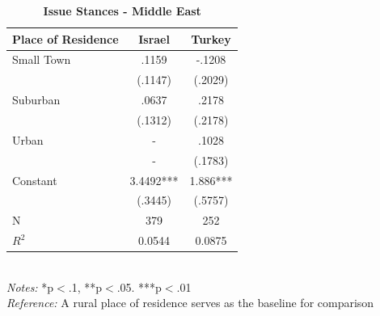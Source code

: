 \documentclass[12pt, titlepage]{article}
\newcommand\e{\emph}
\newcommand\tb{\textbf}
\begin{document}
\begin{singlespace}
	\begin{table}[H]
		\centering
		\caption{\tb{Issue Stances - Middle East}}
		\begin{tabulary}{\linewidth}{l c c}

			\hline
			\tb{Place of Residence}&\tb{Israel} & \tb{Turkey} \\
			\hline
			Small Town&.1159&-.1208 \\
			&(.1147)&(.2029) \\
			Suburban&.0637 &.2178 \\
			&(.1312) &(.2178) \\
			Urban&- &.1028 \\
			&- &(.1783)\\
			Constant&3.4492***&1.886*** \\
			&(.3445)&(.5757) \\
			N&379&252 \\
			$R^2$&0.0544&0.0875 \\
			\hline
\end{tabulary}
\\
\e{Notes:} *p$<$.1, **p$<$.05. ***p$<$.01 \\
\e{Reference:} A rural place of residence serves as the baseline for comparison
\label{MELib}
\end{table}
\end{singlespace}
\end{document}
